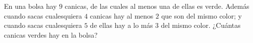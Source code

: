 En una bolsa hay $9$ canicas, de las cuales al menos una de ellas es verde. Además cuando sacas cualesquiera $4$ canicas hay al menos $2$ que son del mismo color; y cuando sacas cualesquiera $5$ de ellas hay a lo más $3$ del mismo color. ¿Cuántas canicas verdes hay en la bolsa?